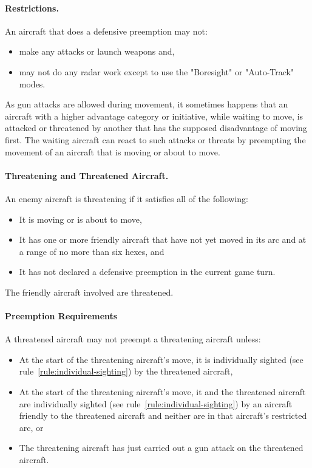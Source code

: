 {\paragraph{Restrictions.} An aircraft that does a defensive preemption may not:  

\begin{itemize}
    \item make any attacks or launch weapons and,
    \item may not do any radar work except to use the "Boresight" or "Auto-Track" modes.
\end{itemize}	
}{

As gun attacks are allowed during movement, it sometimes happens that an aircraft with a higher advantage category or initiative, while waiting to move, is attacked or threatened by another that has the supposed disadvantage of moving first. The waiting aircraft can react to such attacks or threats by preempting the movement of an aircraft that is moving or about to move.

\paragraph{Threatening and Threatened Aircraft.} An enemy aircraft is threatening if it satisfies all of the following:

\begin{itemize}
\item It is moving or is about to move,
\item It has one or more friendly aircraft that have not yet moved in its  arc and at a range of no more than six hexes, and
\item It has not declared a defensive preemption in the current game turn.
\end{itemize}
The friendly aircraft involved are threatened.

\paragraph{Preemption Requirements} A threatened aircraft may not preempt a threatening aircraft unless:
\begin{itemize}
     \item At the start of the threatening aircraft’s move, it is individually sighted (see rule~\ref{rule:individual-sighting}) by the threatened aircraft,
     \item At the start of the threatening aircraft’s move, it and the threatened aircraft are individually sighted (see rule~\ref{rule:individual-sighting}) by an aircraft friendly to the threatened aircraft and neither are in that aircraft’s restricted arc, or
     \item The threatening aircraft has just carried out a gun attack on the threatened aircraft.
\end{itemize}

}
